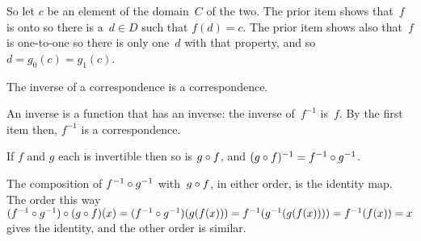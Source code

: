 \documentclass{ibl}  %
\begin{document}
\begin{problem}
\begin{exes}
\begin{answer}
  So let $c$ be an element of the domain~$C$ of the two.
  The prior item shows that~$f$ is onto so there is a~$d\in D$ such that
  $f(d)=c$.
  The prior item shows also that~$f$ is one-to-one so there is only 
  one~$d$ with that property, and so $d=g_0(c)=g_1(c)$.  
\end{answer}
\begin{exercise} 
  The inverse of a correspondence is a correspondence.  
\end{exercise}
\begin{answer}
  An inverse is a function that has an inverse: the inverse of~$f^{-1}$
  is~$f$.
  By the first item then, $f^{-1}$ is a correspondence.  
\end{answer}
\begin{exercise} 
  If $f$ and $g$ each is invertible then so is 
  $g\mathbin{\circ} f$, and $(g\mathbin{\circ} f)^{-1}=f^{-1}\mathbin{\circ} g^{-1}$.
\end{exercise}
\begin{answer}
  The composition of $f^{-1}\mathbin{\circ} g^{-1}$ with~$g\mathbin{\circ} f$,
  in either order, is the identity map.
  The order this way  
  $(f^{-1}\mathbin{\circ} g^{-1})\mathbin{\circ} (g\mathbin{\circ} f)(x)
  =(f^{-1}\mathbin{\circ} g^{-1})(g(f(x)))
  =f^{-1}(g^{-1}(g(f(x))))
  =f^{-1}(f(x))=x$
  gives the identity,
  and the other order is similar.  
\end{answer}
\end{exes}

   

\end{problem}
\end{document}
